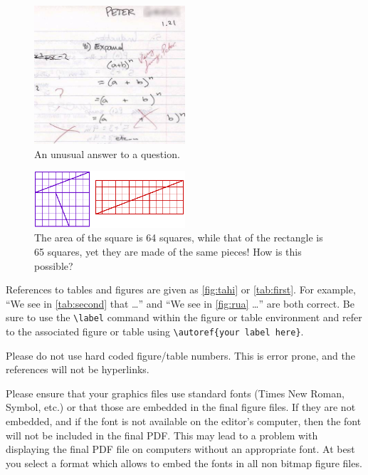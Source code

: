 \documentclass{scspaperproc}
\theoremstyle{scsthe}
\begin{document}
\begin{figure}[htb]
{
\centering
\includegraphics[width=0.50\textwidth]{MathExpandExpression}
\caption{An unusual answer to a question.}\label{fig:tahi}
}
\end{figure}

\begin{figure}[htb]
{
\centering
\includegraphics[width=0.50\textwidth]{puzzle}
\caption{The area of the square is 64 squares, while that of the rectangle is 65 squares, yet they are made of the same pieces! How
is this possible?}\label{fig:rua}
}
\end{figure}

References to tables and figures are given as \autoref{fig:tahi} or \autoref{tab:first}. For example, ``We see in \autoref{tab:second} that \ldots'' and ``We see in \autoref{fig:rua} \ldots'' are both correct. Be sure to use the \verb+\label+ command within the figure or table environment and refer to the associated figure or table using \verb+\autoref{your label here}+.

Please do not use hard coded figure/table numbers. This is error prone, and the references will not be hyperlinks.

Please ensure that your graphics files use standard fonts (Times New Roman, Symbol, etc.) or that those are embedded in the final figure files.
If they are not embedded, and if the font is not available on the editor's computer, then the font will not be included in the final PDF.
This may lead to a problem with displaying the final PDF file on computers without an appropriate font.
At best you select a format which allows to embed the fonts in all non bitmap figure files.
\end{document}
